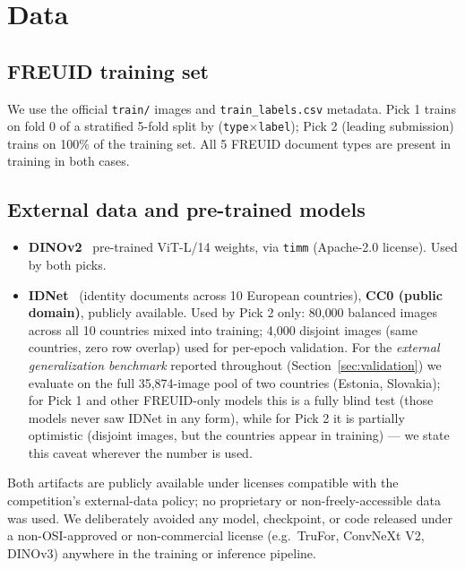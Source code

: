 \documentclass[11pt,a4paper]{article}
\begin{document}
\section{Data}
\label{sec:data}

\subsection{FREUID training set}
\label{sec:external-data}
We use the official \texttt{train/} images and \texttt{train\_labels.csv}
metadata. Pick 1 trains on fold 0 of a stratified 5-fold split by
(\texttt{type}$\times$\texttt{label}); Pick 2 (leading submission) trains on
100\% of the training set. All 5 FREUID document types are present in
training in both cases.

\subsection{External data and pre-trained models}
\begin{itemize}[noitemsep]
  \item \textbf{DINOv2}~\cite{dinov2} pre-trained ViT-L/14 weights, via
    \texttt{timm} (Apache-2.0 license). Used by both picks.
  \item \textbf{IDNet}~\cite{idnet2024} (identity documents across 10 European
    countries), \textbf{CC0 (public domain)}, publicly available. Used by
    Pick 2 only: 80{,}000 balanced images across all 10 countries mixed into
    training; 4{,}000 disjoint images (same countries, zero row overlap) used
    for per-epoch validation. For the \emph{external generalization
    benchmark} reported throughout (Section~\ref{sec:validation}) we evaluate
    on the full 35{,}874-image pool of two countries (Estonia, Slovakia); for
    Pick 1 and other FREUID-only models this is a fully blind test (those
    models never saw IDNet in any form), while for Pick 2 it is partially
    optimistic (disjoint images, but the countries appear in training) --- we
    state this caveat wherever the number is used.
\end{itemize}
Both artifacts are publicly available under licenses compatible with the
competition's external-data policy; no proprietary or non-freely-accessible data
was used. We deliberately avoided any model, checkpoint, or code released under
a non-OSI-approved or non-commercial license (e.g.\ TruFor, ConvNeXt V2, DINOv3)
anywhere in the training or inference pipeline.
\end{document}
